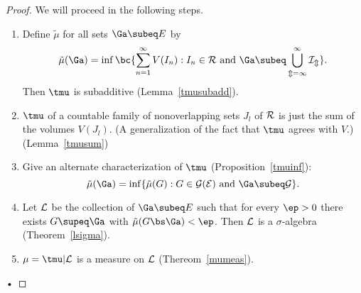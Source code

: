 \begin{proof}
We will proceed in the following steps.
\begin{enumerate}
\item Define $\tilde{\mu}$ for all sets $\Ga\subeq E$ by
\[
\tilde{\mu}(\Ga)=\inf\bc{
\sum_{n=1}^{\infty} V(I_n):I_n\in \cal R \text{ and }\Ga\subeq \bigcup_{m=1}^{\infty} I_m
}.\]
Then $\tmu$ is subadditive (Lemma~\ref{tmusubadd}).
\item $\tmu$ of a countable family of nonoverlapping sets $J_l$ of $\cal R$ is just the sum of the volumes $V(J_l)$. (A generalization of the fact that $\tmu$ agrees with $V$.) (Lemma~\ref{tmusum})
\item Give an alternate characterization of $\tmu$ (Proposition~\ref{tmuinf}):
\[
\tilde{\mu}(\Ga)=
\inf\{\tilde{\mu}(G):G\in \cal G(E)\text{ and }\Ga\subeq G\}.
\]
\item Let $\cal L$ be the collection of $\Ga\subeq E$ such that for every $\ep>0$ there exists $G\supeq \Ga$ with $\tilde{\mu}(G\bs \Ga)<\ep$.
Then $\cal L$ is a $\sigma$-algebra (Theorem~\ref{lsigma}).
\item $\mu=\tmu|{\cal L}$ is a measure on $\cal L$ (Thereom~\ref{mumeas}).
\end{enumerate}•
\end{proof}


